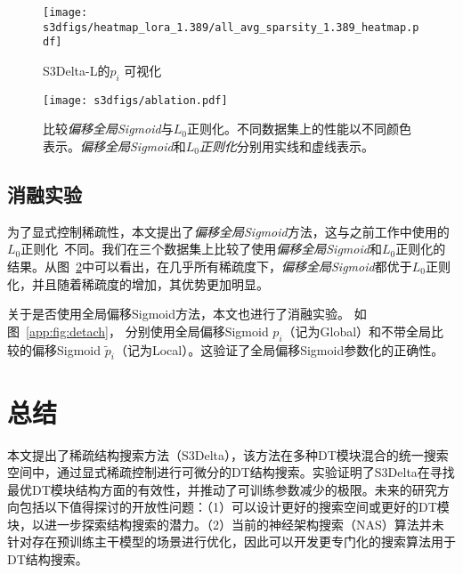 \begin{figure}[!htbp]
    \centering
    \texttt{[image: s3dfigs/heatmap\_lora\_1.389/all\_avg\_sparsity\_1.389\_heatmap.pdf]} 
    \caption{S3Delta-L的$p_{i}$ 可视化}
    \label{fig:vis-delta2}
\end{figure}


\begin{figure}
       \centering
       \texttt{[image: s3dfigs/ablation.pdf]}
       \caption{比较\emph{偏移全局Sigmoid}与$L_0$正则化。不同数据集上的性能以不同颜色表示。\emph{偏移全局Sigmoid}和\emph{$L_0$正则化}分别用实线和虚线表示。 }
       \label{fig:ablation}
\end{figure}

\subsection{消融实验}

为了显式控制稀疏性，本文提出了\emph{偏移全局Sigmoid}方法，这与之前工作中使用的$L_0$正则化~\cite{louizos2017learning}不同。我们在三个数据集上比较了使用\emph{偏移全局Sigmoid}和$L_0$正则化的结果。从图~\ref{fig:ablation}中可以看出，在几乎所有稀疏度下，\emph{偏移全局Sigmoid}都优于$L_0$正则化，并且随着稀疏度的增加，其优势更加明显。


关于是否使用全局偏移Sigmoid方法，本文也进行了消融实验。 如图~\ref{app:fig:detach}， 分别使用全局偏移Sigmoid $p_i$（记为Global）和不带全局比较的偏移Sigmoid $\tilde{p}_i$（记为Local）。这验证了全局偏移Sigmoid参数化的正确性。


\section{总结}
本文提出了稀疏结构搜索方法（S3Delta），该方法在多种DT模块混合的统一搜索空间中，通过显式稀疏控制进行可微分的DT结构搜索。实验证明了S3Delta在寻找最优DT模块结构方面的有效性，并推动了可训练参数减少的极限。未来的研究方向包括以下值得探讨的开放性问题：（1）可以设计更好的搜索空间或更好的DT模块，以进一步探索结构搜索的潜力。（2）当前的神经架构搜索（NAS）算法并未针对存在预训练主干模型的场景进行优化，因此可以开发更专门化的搜索算法用于DT结构搜索。


